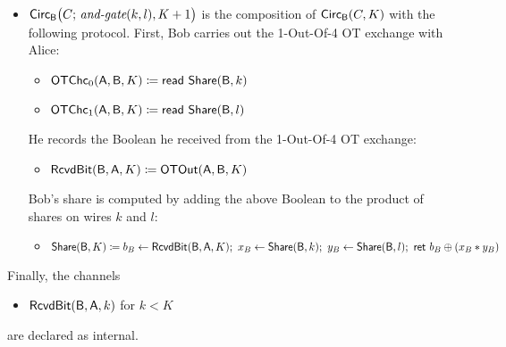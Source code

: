 \begin{itemize}
\item $\mathsf{Circ}_{\mathsf{B}}\big(C; \, \textit{and-gate}(k,l),K+1\big)$ is the composition of $\mathsf{Circ}_{\mathsf{B}}(C,K)$ with the following protocol. First, Bob carries out the 1-Out-Of-4 OT exchange with Alice:
\begin{itemize}
\item $\mathsf{OTChc}_0(\mathsf{A},\mathsf{B},K) \coloneqq \mathsf{read} \ \mathsf{Share}(\mathsf{B},k)$
\item $\mathsf{OTChc}_1(\mathsf{A},\mathsf{B},K) \coloneqq \mathsf{read} \ \mathsf{Share}(\mathsf{B},l)$
\end{itemize}
He records the Boolean he received from the 1-Out-Of-4 OT exchange:
\begin{itemize}
\item $\mathsf{RcvdBit}(\mathsf{B},\mathsf{A},K) \coloneqq \mathsf{OTOut}(\mathsf{A},\mathsf{B},K)$
\end{itemize}
Bob's share is computed by adding the above Boolean to the product of shares on wires $k$ and $l$:
\begin{itemize}
\item $\mathsf{Share}(\mathsf{B},K) \coloneqq b_B \leftarrow \mathsf{RcvdBit}(\mathsf{B},\mathsf{A},K); \ x_B \leftarrow \mathsf{Share}(\mathsf{B},k); \ y_B \leftarrow \mathsf{Share}(\mathsf{B},l); \ \mathsf{ret} \ b_B \oplus (x_B * y_B)$
\end{itemize}
\end{itemize}
Finally, the channels
\begin{itemize}
\item $\mathsf{RcvdBit}(\mathsf{B},\mathsf{A},k)$ for $k < K$
\end{itemize}
are declared as internal.

